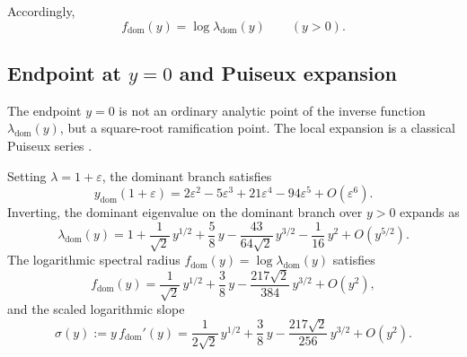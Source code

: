 Accordingly,
\[
f_{\mathrm{dom}}(y)=\log \lambda_{\mathrm{dom}}(y)
\qquad (y>0).
\]

\subsection{Endpoint at \texorpdfstring{\(y=0\)}{y=0} and Puiseux expansion}\label{subsec:endpoint-puiseux}

The endpoint $y = 0$ is not an ordinary analytic point of the inverse function $\lambda_{\mathrm{dom}}(y)$, but a square-root ramification point.
The local expansion is a classical Puiseux series \cite{BrieskornKnorrer1986,Walker1950}.

\begin{proposition}[Endpoint Puiseux expansion at \(y=0\)]\label{prop:endpoint-puiseux}
Setting $\lambda = 1 + \varepsilon$, the dominant branch satisfies
\begin{equation}\label{eq:y-puiseux}
y_{\mathrm{dom}}(1 + \varepsilon)
= 2\varepsilon^2 - 5\varepsilon^3 + 21\varepsilon^4 - 94\varepsilon^5 + O(\varepsilon^6).
\end{equation}
Inverting, the dominant eigenvalue on the dominant branch over \(y>0\) expands as
\begin{equation}\label{eq:lambda-puiseux}
\lambda_{\mathrm{dom}}(y)
= 1 + \frac{1}{\sqrt{2}}\,y^{1/2}
+ \frac{5}{8}\,y
- \frac{43}{64\sqrt{2}}\,y^{3/2}
- \frac{1}{16}\,y^2
+ O(y^{5/2}).
\end{equation}
The logarithmic spectral radius
$f_{\mathrm{dom}}(y) = \log\lambda_{\mathrm{dom}}(y)$
satisfies
\begin{equation}\label{eq:f-puiseux}
f_{\mathrm{dom}}(y)
= \frac{1}{\sqrt{2}}\,y^{1/2}
+ \frac{3}{8}\,y
- \frac{217\sqrt{2}}{384}\,y^{3/2}
+ O(y^2),
\end{equation}
and the scaled logarithmic slope
\begin{equation}\label{eq:rho-endpoint}
\sigma(y):=y\,f_{\mathrm{dom}}'(y)
= \frac{1}{2\sqrt{2}}\,y^{1/2}
+ \frac{3}{8}\,y
- \frac{217\sqrt{2}}{256}\,y^{3/2}
+ O(y^2).
\end{equation}
\end{proposition}

